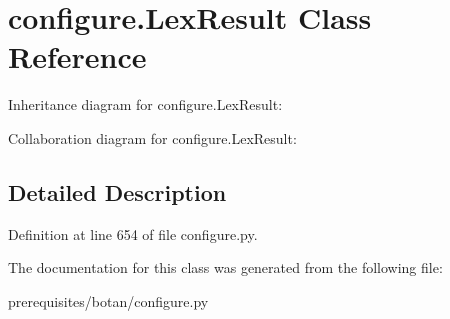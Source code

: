 \hypertarget{classconfigure_1_1_lex_result}{}\section{configure.\+Lex\+Result Class Reference}
\label{classconfigure_1_1_lex_result}


Inheritance diagram for configure.\+Lex\+Result\+:


Collaboration diagram for configure.\+Lex\+Result\+:


\subsection{Detailed Description}


Definition at line 654 of file configure.\+py.



The documentation for this class was generated from the following file\+:\begin{DoxyCompactItemize}
\item 
prerequisites/botan/configure.\+py\end{DoxyCompactItemize}
